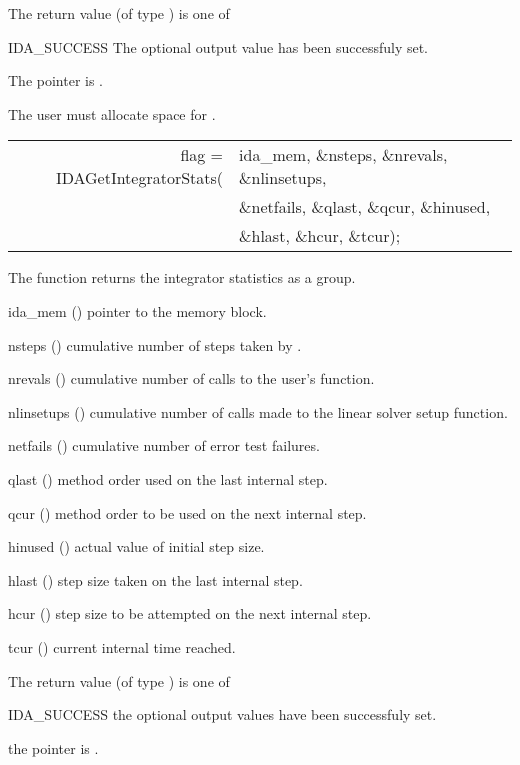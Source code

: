 {
  The return value  (of type ) is one of
  \begin{args}
  \item[IDA\_SUCCESS] 
    The optional output value has been successfuly set.
  \item[\Id{IDA\_MEM\_NULL}]
    The  pointer is .
  \end{args}
}
{
  {\warn} The user must allocate space for .
}
{
  \begin{tabular}[t]{@{}r@{}l@{}}
    flag = IDAGetIntegratorStats(&ida\_mem, \&nsteps, \&nrevals, \&nlinsetups, \\
                                 &\&netfails, \&qlast, \&qcur, \&hinused,\\
                                 &\&hlast, \&hcur, \&tcur);
  \end{tabular}
}
{
  The function  returns the {\ida} integrator statistics
  as a group.
}
{
  \begin{args}[nlinsetups]
  \item[ida\_mem] ()
    pointer to the {\ida} memory block.
  \item[nsteps] ()
    cumulative number of steps taken by {\ida}.
  \item[nrevals] ()
    cumulative number of calls to the user's  function.
  \item[nlinsetups] ()
    cumulative number of calls made to the linear solver setup function.
  \item[netfails] ()
    cumulative number of error test failures.
  \item[qlast] ()
    method order used on the last internal step.
  \item[qcur] ()
    method order to be used on the next internal step.
  \item[hinused] ()
    actual value of initial step size.
  \item[hlast] ()
    step size taken on the last internal step.
  \item[hcur] ()
    step size to be attempted on the next internal step.
  \item[tcur] ()
    current internal time reached.
  \end{args}
}
{
  The return value  (of type ) is one of
  \begin{args}
  \item[IDA\_SUCCESS] 
    the optional output values have been successfuly set.
  \item[\Id{IDA\_MEM\_NULL}]
    the  pointer is .
  \end{args}
}
